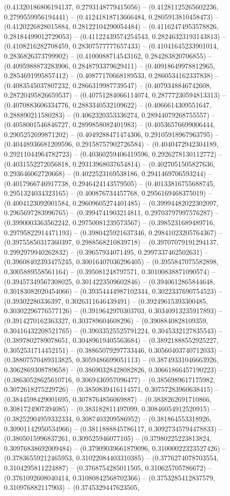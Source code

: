 (0.41320186806194137, 0.2793148779415056) -- (0.41281125265602236, 0.2799559956194441) -- (0.41241818713666484, 0.2805913810458473) -- (0.4120226828015884, 0.28122104290054484) -- (0.41162474953578826, 0.28184499012729053) -- (0.41122439574254543, 0.28246323193143813) -- (0.4108216282708459, 0.28307577777657433) -- (0.41041645233901014, 0.2836826373799902) -- (0.4100088714543162, 0.284283820706855) -- (0.4095988873283906, 0.2848793379629411) -- (0.40918649978812965, 0.2854691995857412) -- (0.40877170668189533, 0.2860534162337838) -- (0.4083545037807232, 0.2866319987739547) -- (0.4079348846742608, 0.28720495826659537) -- (0.40751284066114074, 0.28777230594813313) -- (0.4070883606334776, 0.2883340532109622) -- (0.4066614309551647, 0.288890211580283) -- (0.4062320353336274, 0.28944079268755557) -- (0.4058001546846727, 0.2899858082401983) -- (0.40536576699006444, 0.2905252699871202) -- (0.4049288471474306, 0.29105918967963795) -- (0.40448936681209596, 0.29158757902726584) -- (0.4040472942304189, 0.29211044964782723) -- (0.40360259406419596, 0.2926278130112772) -- (0.4031552272056818, 0.29313968037654814) -- (0.4027051505827636, 0.293646062720668) -- (0.4022523169538186, 0.2941469706593244) -- (0.4017966746917738, 0.2946424143579505) -- (0.40133816755688745, 0.2951324034323165) -- (0.400876734457768, 0.2956169468375019) -- (0.4004123092001584, 0.29609605274401485) -- (0.39994482022302097, 0.2965697283996765) -- (0.3994741903214811, 0.29703797997576287) -- (0.3990003363562242, 0.29750081239573567) -- (0.3985231689489716, 0.29795822914471193) -- (0.3980425921637346, 0.29841023205764367) -- (0.39755850317360397, 0.2988568210839718) -- (0.39707079191294137, 0.2992979940262832) -- (0.39657934071495, 0.2997337462502631) -- (0.39608402393475245, 0.30016407036296405) -- (0.3955847075582898, 0.3005889558561164) -- (0.395081248797571, 0.30100838871090574) -- (0.39457349567308025, 0.3014223509602846) -- (0.3940612865844648, 0.30183082020454066) -- (0.39354444987102344, 0.3022337690754523) -- (0.39302280336397, 0.3026311646439491) -- (0.39249615393300485, 0.30302296776577126) -- (0.3919642970303703, 0.30340913235917893) -- (0.3914270162363327, 0.303789604608296) -- (0.3908840828109359, 0.30416432208521765) -- (0.39033525525791224, 0.3045332127835543) -- (0.3897802789078651, 0.30489619405563684) -- (0.38921888552925227, 0.3052531714452151) -- (0.38865079297733446, 0.30560403740712033) -- (0.38807570489313825, 0.3059486699051113) -- (0.38749331046663926, 0.3062869308789658) -- (0.38690328428082826, 0.30661866457190223) -- (0.38630528625610716, 0.3069436957096477) -- (0.3856989617175982, 0.3072618275229726) -- (0.3850839416114571, 0.30757283960638415) -- (0.3844598429001695, 0.3078764856069887) -- (0.3838262691710866, 0.3081724907394085) -- (0.383182811497099, 0.30846054912520915) -- (0.38252904959332334, 0.3087403209586952) -- (0.381864553318926, 0.30901142950534966) -- (0.3811888845786117, 0.30927345794478833) -- (0.3805015996837261, 0.309525946077105) -- (0.37980225223813824, 0.30976838692009484) -- (0.37909039661879096, 0.31000022323527426) -- (0.37836559212465953, 0.31022084403310385) -- (0.3776274078703554, 0.3104295811224887) -- (0.3768754285011505, 0.310625705786672) -- (0.3761092608040414, 0.31080842568702366) -- (0.3753285412837579, 0.310976882117903) -- (0.3745329447623505, 